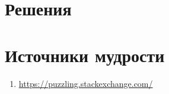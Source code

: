 \documentclass[12pt]{article}
\newcounter{problem}[section]
\theoremstyle{definition}
\begin{document}

\renewenvironment{solution}[1]{%
         \vskip .5cm plus 2cm minus 0.1cm%
         {\bfseries \hyperlink{problem:#1}{#1.}}%
}%
{%
}%



\section{Решения}



\section{Источники мудрости}


\begin{enumerate}
\item \url{https://puzzling.stackexchange.com/}
\end{enumerate}

\printbibliography[heading=none]
\end{document}
